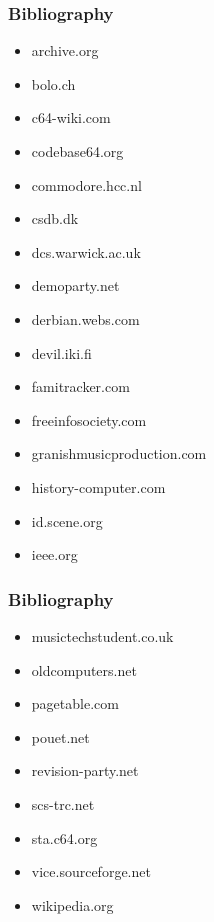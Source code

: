 
\begin{frame}
\frametitle{Bibliography}

\begin{multicols}{2}
\begin{itemize}
\item archive.org
\item bolo.ch
\item c64-wiki.com
\item codebase64.org
\item commodore.hcc.nl
\item csdb.dk
\item dcs.warwick.ac.uk
\item demoparty.net
\item derbian.webs.com
\item devil.iki.fi
\item famitracker.com
\item freeinfosociety.com
\item granishmusicproduction.com
\item history-computer.com
\item id.scene.org
\item ieee.org
\end{itemize}
\end{multicols}

\end{frame}


\begin{frame}
\frametitle{Bibliography}

\begin{multicols}{2}
\begin{itemize}
\item musictechstudent.co.uk
\item oldcomputers.net
\item pagetable.com
\item pouet.net
\item revision-party.net
\item scs-trc.net
\item sta.c64.org
\item vice.sourceforge.net
\item wikipedia.org
\end{itemize}
\end{multicols}

\end{frame}


